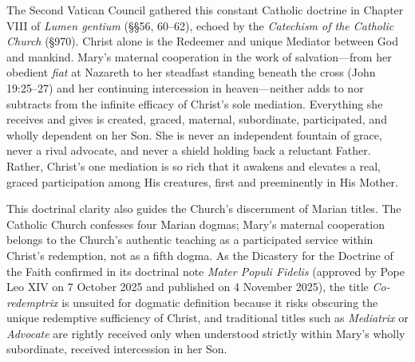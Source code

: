 The Second Vatican Council gathered this constant Catholic doctrine in Chapter VIII of \textit{Lumen gentium} (\S\S 56, 60--62), echoed by the \textit{Catechism of the Catholic Church} (\S 970). Christ alone is the Redeemer and unique Mediator between God and mankind. Mary's maternal cooperation in the work of salvation---from her obedient \textit{fiat} at Nazareth to her steadfast standing beneath the cross (John 19:25--27) and her continuing intercession in heaven---neither adds to nor subtracts from the infinite efficacy of Christ's sole mediation. Everything she receives and gives is created, graced, maternal, subordinate, participated, and wholly dependent on her Son. She is never an independent fountain of grace, never a rival advocate, and never a shield holding back a reluctant Father. Rather, Christ's one mediation is so rich that it awakens and elevates a real, graced participation among His creatures, first and preeminently in His Mother.

This doctrinal clarity also guides the Church's discernment of Marian titles. The Catholic Church confesses four Marian dogmas; Mary's maternal cooperation belongs to the Church's authentic teaching as a participated service within Christ's redemption, not as a fifth dogma. As the Dicastery for the Doctrine of the Faith confirmed in its doctrinal note \textit{Mater Populi Fidelis} (approved by Pope Leo XIV on 7 October 2025 and published on 4 November 2025), the title \textit{Co-redemptrix} is unsuited for dogmatic definition because it risks obscuring the unique redemptive sufficiency of Christ, and traditional titles such as \textit{Mediatrix} or \textit{Advocate} are rightly received only when understood strictly within Mary's wholly subordinate, received intercession in her Son.
